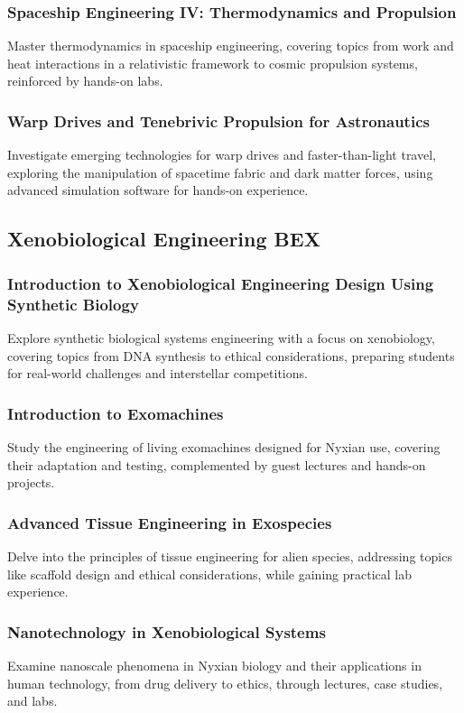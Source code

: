 \subsubsection{Spaceship Engineering IV: Thermodynamics and Propulsion}
Master thermodynamics in spaceship engineering, covering topics from work and heat interactions in a relativistic framework to cosmic propulsion systems, reinforced by hands-on labs.
\subsubsection{Warp Drives and Tenebrivic Propulsion for Astronautics}
Investigate emerging technologies for warp drives and faster-than-light travel, exploring the manipulation of spacetime fabric and dark matter forces, using advanced simulation software for hands-on experience.

\subsection{Xenobiological Engineering \hfill BEX}
\subsubsection{Introduction to Xenobiological Engineering Design Using Synthetic Biology}
Explore synthetic biological systems engineering with a focus on xenobiology, covering topics from DNA synthesis to ethical considerations, preparing students for real-world challenges and interstellar competitions.
\subsubsection{Introduction to Exomachines}
Study the engineering of living exomachines designed for Nyxian use, covering their adaptation and testing, complemented by guest lectures and hands-on projects.
\subsubsection{Advanced Tissue Engineering in Exospecies}
Delve into the principles of tissue engineering for alien species, addressing topics like scaffold design and ethical considerations, while gaining practical lab experience.
\subsubsection{Nanotechnology in Xenobiological Systems}
Examine nanoscale phenomena in Nyxian biology and their applications in human technology, from drug delivery to ethics, through lectures, case studies, and labs.
